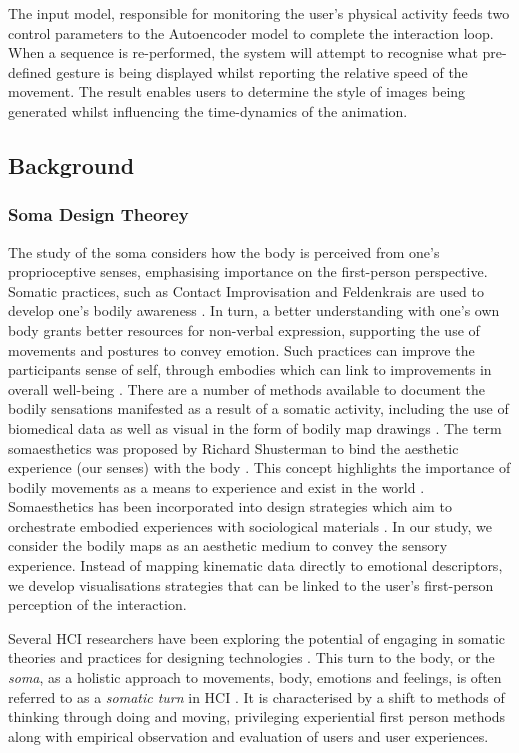 The input model, responsible for monitoring the user’s physical activity feeds two control parameters to the Autoencoder model to complete the interaction loop. When a sequence is re-performed, the system will attempt to recognise what pre-defined gesture is being displayed whilst reporting the relative speed of the movement. The result enables users to determine the style of images being generated whilst influencing the time-dynamics of the animation.

\subsection{Background}

\subsubsection{Soma Design Theorey}
The study of the soma considers how the body is perceived from one's proprioceptive senses, emphasising importance on the first-person perspective\cite{hook_embracing_2018}. Somatic practices, such as Contact Improvisation and Feldenkrais are used to develop one’s bodily awareness \cite{tsaknaki_teaching_2019}. In turn, a better understanding with one's own body grants better resources for non-verbal expression, supporting the use of movements and postures to convey emotion. Such practices can improve the participants sense of self, through embodies which can link to improvements in overall well-being \cite{samaritter_aesthetic_2018}. There are a number of methods available to document the bodily sensations manifested as a result of a somatic activity, including the use of biomedical data \cite{hook_soma_2019} as well as visual in the form of bodily map drawings \cite{windlin_soma_2019}. The term somaesthetics was proposed by Richard Shusterman to bind the aesthetic experience (our senses) with the body \cite{hook_somaesthetic_2016}. This concept highlights the importance of bodily movements as a means to experience and exist in the world \cite{shusterman_body_2008}. Somaesthetics has been incorporated into design strategies which aim to orchestrate embodied experiences with sociological materials \cite{tsaknaki_teaching_2019}. In our study, we consider the bodily maps as an aesthetic medium to convey the sensory experience. Instead of mapping kinematic data directly to emotional descriptors, we develop visualisations strategies that can be linked to the user's first-person perception of the interaction.

Several HCI researchers have been exploring the potential of engaging in somatic theories and practices for designing technologies \cite{hook_somaesthetic_2016}. This turn to the body, or the \textit{soma}, as a holistic approach to movements, body, emotions and feelings, is often referred to as a \textit{somatic turn} in HCI \cite{loke_somatic_2018}. It is characterised by a shift to methods of thinking through doing and moving, privileging experiential first person methods \cite{hook_embracing_2018} along with empirical observation and evaluation of users and user experiences.

